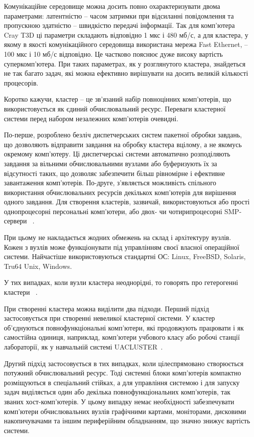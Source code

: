 Комунікаційне середовище можна досить повно охарактеризувати двома параметрами: латентністю -- часом затримки при відсиланні повідомлення та пропускною здатністю -- швидкістю передачі інформації. Так для комп'ютера Cray T3D ці параметри складають відповідно 1 мкс і 480 мб/с, а для кластера, у якому в якості комунікаційного середовища використана мережа Fast Ethernet, -- 100 мкс і 10 мб/с відповідно. Це частково пояснює дуже високу вартість суперкомп'ютера. При таких параметрах, як у розглянутого кластера, знайдеться не так багато задач, які можна ефективно вирішувати на досить великій кількості процесорів.

Коротко кажучи, кластер -- це зв'язаний набір повноцінних комп'ютерів, що використовується як єдиний обчислювальний ресурс. Переваги кластерної системи перед набором незалежних комп'ютерів очевидні.

По-перше, розроблено безліч диспетчерських систем пакетної обробки завдань, що дозволяють відправити завдання на обробку кластера вцілому, а не якомусь окремому комп'ютеру. Ці диспетчерські системи автоматично розподіляють завдання за вільними обчислювальними вузлами або буферизують їх за відсутності таких, що дозволяє забезпечити більш рівномірне і ефективне завантаження комп'ютерів. По-друге, з'являється можливість спільного використання обчислювальних ресурсів декількох комп'ютерів для вирішення одного завдання. Для створення кластерів, зазвичай, використовуються або прості однопроцесорні персональні комп'ютери, або двох- чи чотирипроцесорні SMP-сервери ~\cite{supercomp-architecture-proceed,supercomp-architecture-art}.

При цьому не накладається жодних обмежень на склад і архітектуру вузлів. Кожен з вузлів може функціонувати під управлінням своєї власної операційної системи. Найчастіше використовуються стандартні ОС: Linux, FreeBSD, Solaris, Tru64 Unix, Windows. 

У тих випадках, коли вузли кластера неоднорідні, то говорять про гетерогенні кластери ~\cite{getero-art,getero-taganrog-art}.

При створенні кластера можна виділити два підходи. Перший підхід застосовується при створенні невеликої кластерної системи. У кластер об'єднуються повнофункціональні комп'ютери, які продовжують працювати і як самостійна одиниця, наприклад, комп'ютери учбового класу або робочі станції лабораторії, як у навчальній системі UACLUSTER~\cite{cluster-uacluster}. 

Другий підхід застосовується в тих випадках, коли цілеспрямовано створюється потужний обчислювальний ресурс. Тоді системні блоки комп'ютерів компактно розміщуються в спеціальний стійках, а для управління системою і для запуску задач виділяється один або декілька повнофункціональних комп'ютерів, так званих хост-комп’ютерів. У цьому випадку немає необхідності забезпечувати комп'ютери обчислювальних вузлів графічними картами, моніторами, дисковими накопичувачами та іншим периферійним обладнанням, що значно знижує вартість системи.

